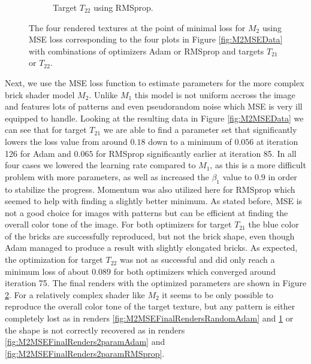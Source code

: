 \begin{figure}
\begin{subfigure}{.25\textwidth}
    \caption{Target $T_{22}$ using RMSprop.}
    \label{fig:M2MSEFinalRendersRandomRMSprop}
\end{subfigure}
\caption{The four rendered textures at the point of minimal loss for $M_2$ using MSE loss corresponding to the four plots in Figure \ref{fig:M2MSEData} with combinations of optimizers Adam or RMSprop and targets $T_{21}$ or $T_{22}$.}
\label{fig:M2MSEFinalRenders}
\end{figure}

Next, we use the MSE loss function to estimate parameters for the more complex brick shader model $M_2$. Unlike $M_1$ this model is not uniform accross the image and features lots of patterns and even pseudorandom noise which MSE is very ill equipped to handle. Looking at the resulting data in Figure \ref{fig:M2MSEData} we can see that for target $T_{21}$ we are able to find a parameter set that significantly lowers the loss value from around $0.18$ down to a minimum of $0.056$ at iteration 126 for Adam and $0.065$ for RMSprop significantly earlier at iteration 85. In all four cases we lowered the learning rate compared to $M_1$, as this is a more difficult problem with more parameters, as well as increased the $\beta_1$ value to $0.9$ in order to stabilize the progress. Momentum was also utilized here for RMSprop which seemed to help with finding a slightly better minimum. As stated before, MSE is not a good choice for images with patterns but can be efficient at finding the overall color tone of the image. For both optimizers for target $T_{21}$ the blue color of the bricks are successfully reproduced, but not the brick shape, even though Adam managed to produce a result with slightly elongated bricks. As expected, the optimization for target $T_{22}$ was not as successful and did only reach a minimum loss of about $0.089$ for both optimizers which converged around iteration 75. The final renders with the optimized parameters are shown in Figure \ref{fig:M2MSEFinalRenders}. For a relatively complex shader like $M_2$ it seems to be only possible to reproduce the overall color tone of the target texture, but any pattern is either completely lost as in renders \ref{fig:M2MSEFinalRendersRandomAdam} and \ref{fig:M2MSEFinalRendersRandomRMSprop} or the shape is not correctly recovered as in renders \ref{fig:M2MSEFinalRenders2paramAdam} and \ref{fig:M2MSEFinalRenders2paramRMSprop}.


